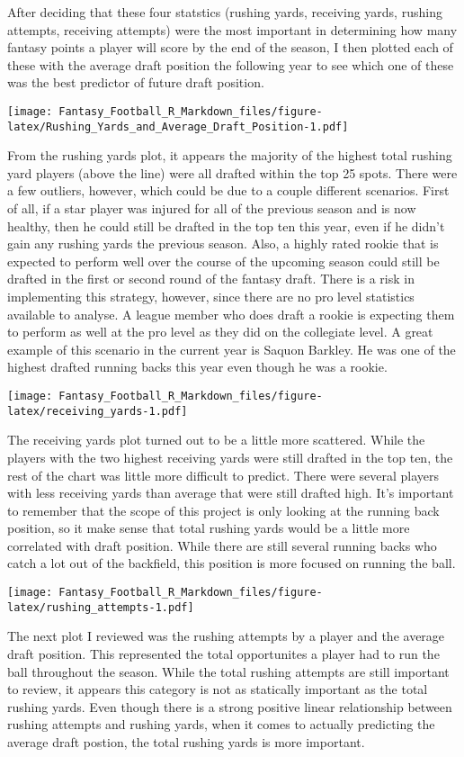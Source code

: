 \documentclass[]{article}
\begin{document}
After deciding that these four statstics (rushing yards, receiving
yards, rushing attempts, receiving attempts) were the most important in
determining how many fantasy points a player will score by the end of
the season, I then plotted each of these with the average draft position
the following year to see which one of these was the best predictor of
future draft position.

\texttt{[image: Fantasy\_Football\_R\_Markdown\_files/figure-latex/Rushing\_Yards\_and\_Average\_Draft\_Position-1.pdf]}

From the rushing yards plot, it appears the majority of the highest
total rushing yard players (above the line) were all drafted within the
top 25 spots. There were a few outliers, however, which could be due to
a couple different scenarios. First of all, if a star player was injured
for all of the previous season and is now healthy, then he could still
be drafted in the top ten this year, even if he didn't gain any rushing
yards the previous season. Also, a highly rated rookie that is expected
to perform well over the course of the upcoming season could still be
drafted in the first or second round of the fantasy draft. There is a
risk in implementing this strategy, however, since there are no pro
level statistics available to analyse. A league member who does draft a
rookie is expecting them to perform as well at the pro level as they did
on the collegiate level. A great example of this scenario in the current
year is Saquon Barkley. He was one of the highest drafted running backs
this year even though he was a rookie.

\texttt{[image: Fantasy\_Football\_R\_Markdown\_files/figure-latex/receiving\_yards-1.pdf]}

The receiving yards plot turned out to be a little more scattered. While
the players with the two highest receiving yards were still drafted in
the top ten, the rest of the chart was little more difficult to predict.
There were several players with less receiving yards than average that
were still drafted high. It's important to remember that the scope of
this project is only looking at the running back position, so it make
sense that total rushing yards would be a little more correlated with
draft position. While there are still several running backs who catch a
lot out of the backfield, this position is more focused on running the
ball.

\texttt{[image: Fantasy\_Football\_R\_Markdown\_files/figure-latex/rushing\_attempts-1.pdf]}

The next plot I reviewed was the rushing attempts by a player and the
average draft position. This represented the total opportunites a player
had to run the ball throughout the season. While the total rushing
attempts are still important to review, it appears this category is not
as statically important as the total rushing yards. Even though there is
a strong positive linear relationship between rushing attempts and
rushing yards, when it comes to actually predicting the average draft
postion, the total rushing yards is more important.
\end{document}
